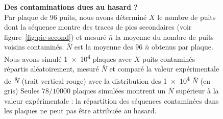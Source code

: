 \begin{center}
\begin{figure}[h!]


    \caption[Des contaminations dues au hasard ?]{%
      \label{fig:simul-count}\textbf{Des contaminations dues au hasard ? } \\
      \rmfamily Par plaque de 96 puits, nous avons déterminé \(X\) le nombre de
      puits dont la séquence montre des traces de pics secondaires (voir
      figure~\ref{fig:pic-second}) et mesuré \(\bar{n}\) la moyenne du nombre de
      puits voisins contaminés. \(\bar{N}\) est la moyenne des 96 \(\bar{n}\)
      obtenus par plaque. Nous avons simulé \num{1e4} plaques avec \(X\) puits
      contaminés répartis aléatoirement, mesuré \(\bar{N}\) et comparé la valeur
      expérimentale de \(\bar{N}\) (trait vertical rouge) avec la distribution
      des \num{1e4} \(\bar{N}\) (en gris) Seules \(78 / 10000\) plaques simulées
      montrent un \(\bar{N}\) supérieur à la valeur expérimentale : la
      répartition des séquences contaminées dans les plaques ne peut pas être
      attribuée au hasard.
    }
  \end{figure}

\end{center}